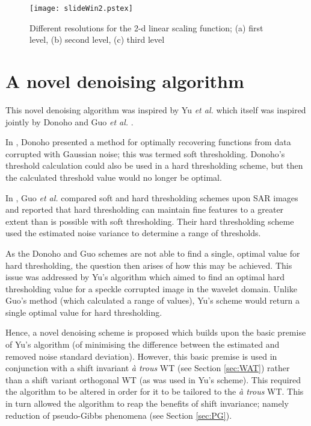 \documentclass[12pt]{report}
\begin{document}
\begin{figure}[!ht]
        \begin{center}
                \texttt{[image: slideWin2.pstex]}
		\caption{Different resolutions for the 2-d linear scaling function; (a) first level, 
		(b) second level, (c) third level}
		\label{slideWin}
        \end{center}
\end{figure}



\section{A novel denoising algorithm}
\label{sec:novelAlg}

This novel denoising algorithm was inspired by Yu \emph{et al.} \cite{yu96} which itself was inspired jointly by 
Donoho \cite{don95} and Guo \emph{et al.} \cite{guo}.

In \cite{don95}, Donoho presented a method for optimally recovering functions
from data corrupted with Gaussian noise; this was termed soft thresholding. Donoho's threshold calculation
could also be used in a hard thresholding scheme, but then the calculated threshold value would no longer be optimal. 

In \cite{guo}, Guo \emph{et al.} compared soft and hard thresholding schemes upon SAR images and reported that hard thresholding 
can maintain fine features to a greater extent than is possible with soft thresholding. Their hard thresholding scheme used the estimated
noise variance to determine a range of thresholds. 

As the Donoho and Guo schemes are not able to find a single, optimal value for hard thresholding, the
question then arises of how this may be achieved. This issue was addressed by Yu's algorithm
which aimed to find an optimal hard thresholding value for a speckle corrupted image in the wavelet domain.
Unlike Guo's method (which calculated a range of values), Yu's scheme would return a single optimal value
for hard thresholding.

Hence, a novel denoising scheme is proposed which builds upon the basic 
premise of Yu's algorithm (of minimising the difference between the estimated and removed
noise standard deviation). However, this basic premise is used in conjunction with a shift invariant \emph{\`a trous} WT
(see Section \ref{sec:WAT}) rather than a shift variant orthogonal WT (as was used 
in Yu's scheme). This required the algorithm to be altered in order for it to be tailored to the \emph{\`a trous} WT. 
This in turn allowed the algorithm to reap the benefits of shift invariance; namely reduction of pseudo-Gibbs phenomena 
(see Section \ref{sec:PG}).
\end{document}
